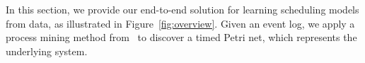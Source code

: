 \label{sec:solution}




In this section, we provide our end-to-end 
solution for learning scheduling models from data, as illustrated in Figure~\ref{fig:overview}. 
Given an event log, we apply a process mining method from~\cite{} 
to discover a timed Petri net, which represents
the underlying system. 

